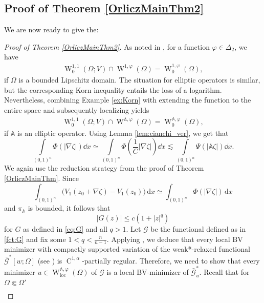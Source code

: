\documentclass[a4paper,11pt]{amsart}
\numberwithin{equation}{section}
\newcommand{\sobo}{\operatorname{W}}
\newcommand{\hold}{\operatorname{C}}
\begin{document}
	
	
	
	
	
	
	\subsection{Proof of Theorem \ref{OrliczMainThm2}}
	
	
	
	
	We are now ready to give the: 
	\begin{proof}[Proof of Theorem \ref{OrliczMainThm2}]
		{As noted in \cite{breit_trace-free_2017}, for a function $\varphi \in \Delta_2$, we have
			\begin{align*}
				\sobo_{0}^{1,1}(\Omega;V)\cap\sobo^{1,\varphi}(\Omega)=\sobo_{0}^{1,\varphi}(\Omega), 
			\end{align*}
			if $\Omega$ is a bounded Lipschitz domain.
			The situation for elliptic operators is similar, but the corresponding Korn inequality entails the loss of a logarithm. Nevertheless, combining Example \ref{ex:Korn} with extending the function to the entire space and subsequently localizing yields
			\begin{align}\label{eq:traceid}
				\sobo_{0}^{1,1}(\Omega;V)\cap\sobo^{\mathbb{A},\varphi}(\Omega)=\sobo_{0}^{\mathbb{A},\varphi}(\Omega), 
			\end{align} if $\mathbb{A}$ is an elliptic operator.
		}
		Using Lemma \ref{lem:cianchi_ver}, we get that \[
		\int \limits_{(0,1)^n} \Phi (|\nabla \zeta|)  \dd{x} \simeq \int \limits_{(0,1)^n} \Phi \left(\frac{1}{C}|\nabla \zeta| \right) \dd{x} \lesssim \int \limits_{(0,1)^n} \Psi(|\mathbb{A}\zeta|) \dd{x}. 
		\]
		We again use the reduction strategy from the proof of Theorem \ref{OrliczMainThm}. Since 
		\[
		\int_{(0,1)^n} \big( V_1 \left(z_0 + \nabla \zeta \right) - V_1 \left(z_0\right) \big) \, \mathrm{d}x \simeq 
		\int_{(0,1)^n} \Phi (|\nabla \zeta|) \, \mathrm{d}x  
		\]
		and $\pi_\mathbb{A}$ is bounded, it follows that 
		\[
		|G(z)| \leq c(1 + |z|^q)
		\]
		for $G$ as defined in \eqref{eq:G} and all $q > 1$. {Let $\mathcal{G}$ be the functional defined as in \eqref{fct:G} and fix some $1 < q < \frac{n}{n-1}$.} Applying \cite[Theorem 2.1]{gmeineder_quasiconvex_2024}, we deduce that every local $\mathrm{BV}$ minimizer with compactly supported variation of the weak*-relaxed functional 
		$\bar{\mathcal{G}}^*[w; \Omega]$ (see \cite[{Definition 1.2}]{gmeineder_quasiconvex_2024})
		is $\hold^{1,\alpha}$-partially regular. Therefore, we need to show that every minimizer $u \in \sobo_\text{loc}^{\mathbb{A},\varphi}(\Omega)$ of $\mathcal{G}$ is a local $\mathrm{BV}$-minimizer of $\bar{\mathcal{G}}_{{u}}^*$. { Recall that for $\Omega \Subset \Omega'$ \begin{multline*}

\end{multline*}}
\end{proof}
\end{document}
